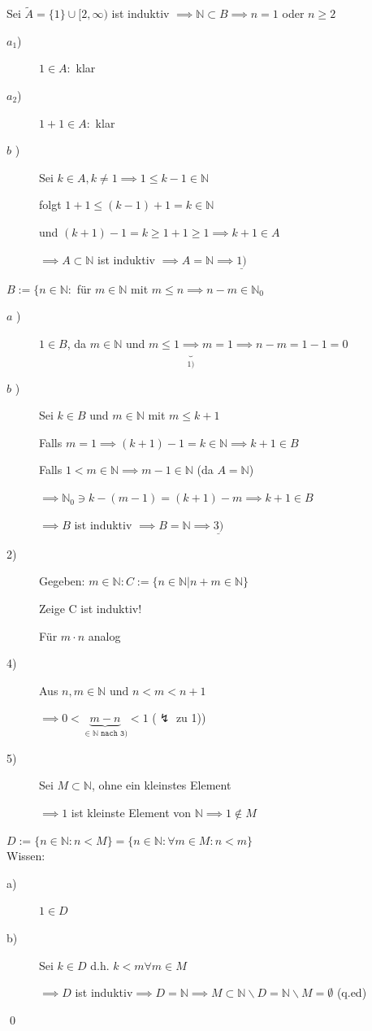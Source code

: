 \documentclass[fleqn]{scrbook}
\renewenvironment{proof}{{\bfseries Beweis }}{\qed}
\begin{document}
\begin{proof}
{Sei $\tilde{A} = \{1\} \cup [2, \infty)$ ist induktiv $\implies \mathbb{N} \subset B \implies n = 1$ oder $n \geq 2$}
\begin{description}
\item[$a_1$)] $1 \in A:$ klar
\item[$a_2$)] $1 + 1 \in A:$ klar
\item[$b$  )] Sei $k \in A, k \neq 1 \implies 1 \leq k - 1 \in \mathbb{N}$

folgt $1 + 1 \leq (k - 1) + 1 = k \in \mathbb{N}$

und $(k + 1) - 1 = k \geq 1 + 1 \geq 1 \implies k + 1 \in A$

$\implies A \subset \mathbb{N}$ ist induktiv $\implies A = \mathbb{N} 
\implies \underline{1)}$
\end{description}
$B := \{n \in \mathbb{N}:$ für $m \in \mathbb{N}$ mit $m \leq n \implies n-m \in \mathbb{N}_0$
\begin{description}
\item[$a$  )] $1 \in B$, da $m \in \mathbb{N}$ und $m \leq 1 \underbrace{\implies}_{1)} m = 1 \implies n-m = 1-1 = 0$
\item[$b$  )] Sei $k \in B$ und $m \in \mathbb{N}$ mit $m \leq k + 1$ 

Falls $m = 1 \implies (k + 1) - 1 = k \in \mathbb{N} \implies k + 1 \in B$

Falls $1 < m \in \mathbb{N} \implies m - 1 \in \mathbb{N}$ (da $A = \mathbb{N}$)

$\implies \mathbb{N}_0 \ni k - (m - 1) = (k + 1) - m \implies k + 1 \in B$

$\implies B$ ist induktiv $\implies B = \mathbb{N} \implies \underline{3)}$
\item[2)] Gegeben: $m \in \mathbb{N}: C:=\{n \in \mathbb{N} | n + m \in \mathbb{N}\}$

Zeige C ist induktiv!

Für $m  \cdot  n $ analog

\item[4)] Aus $n,m \in \mathbb{N} \text{ und } n < m < n + 1$

$\implies 0 < \underbrace{m-n}_{\in \mathbb{N}\texttt{ nach 3)}}<1$ ($\lightning$ zu 1))

\item[5)] Sei $M \subset \mathbb{N}$, ohne ein kleinstes Element

$\implies 1$ ist kleinste Element von $\mathbb{N} \implies 1 \notin M$

\end{description}
$D:=\{n \in \mathbb{N}: n < M\} = \{n \in \mathbb{N}: \forall m \in M: n < m\}$\\Wissen:
\begin{description}

\item[a)] $1 \in D$
\item[b)] Sei $k \in D$ d.h. $k < m \forall m \in M$

$\implies D$ ist induktiv$\implies D = \mathbb{N} \implies M \subset \mathbb{N} \backslash D = \mathbb{N} \backslash M = \emptyset$ (q.ed)
\end{description}
\end{proof}
\end{document}
